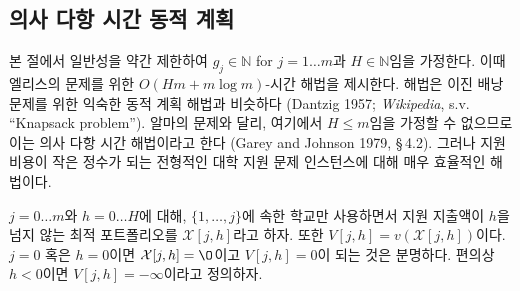 \documentclass[11pt]{article} %
\newif\ifen
\theoremstyle{definition}
\theoremstyle{definition}
\begin{document}
\ifen \subsection{Pseudopolynomial-time dynamic program} \else\subsection{의사 다항 시간 동적 계획} \fi
\ifen
In this subsection, we assume, with a small loss of generality, that $g_j \in \mathbb{N}$ for $j = 1\dots m$ and $H \in\mathbb{N}$, and provide an algorithmic solution to Ellis's problem that runs in $O(Hm + m\log m)$-time. The algorithm resembles a familiar dynamic programming algorithm for the binary knapsack problem (Dantzig 1957; \emph{Wikipedia}, s.v. ``Knapsack problem''). Because we cannot assume that $H \leq m$ (as was the case in Alma's problem), this represents a pseudopolynomial-time solution (Garey and Johnson 1979, \S\,4.2). However, it is quite effective for typical college-application instances in which the application costs are small integers.
\else
본 절에서 일반성을 약간 제한하여 $g_j \in \mathbb{N}$ for $j = 1\dots m$과 $H \in\mathbb{N}$임을 가정한다. 이때 엘리스의 문제를 위한 $O(Hm + m\log m)$-시간 해법을 제시한다. 해법은 이진 배낭 문제를 위한 익숙한 동적 계획 해법과 비슷하다 (Dantzig 1957; \emph{Wikipedia}, s.v. ``Knapsack problem''). 알마의 문제와 달리, 여기에서 $H \leq m$임을 가정할 수 없으므로 이는 의사 다항 시간 해법이라고 한다 (Garey and Johnson 1979, \S\,4.2). 그러나 지원 비용이 작은 정수가 되는 전형적인 대학 지원 문제 인스턴스에 대해 매우 효율적인 해법이다.
\fi

\ifen 
For $j = 0 \dots m$ and $h = 0 \dots H$, let $\mathcal{X}[j, h]$ denote the optimal portfolio using only the schools $\{ 1, \dots, j\}$ and costing no more than $h$, and let $V[j,h] = v(\mathcal{X}[j, h])$.  It is clear that if $j=0$ or $h=0$, then $\mathcal{X}[j, h] = \O$ and $V[j, h] = 0$.  For convenience, we also define $V[j, h] = -\infty$ for all $h < 0$.
\else
$j = 0 \dots m$와 $h = 0 \dots H$에 대해, $\{ 1, \dots, j\}$에 속한 학교만 사용하면서 지원 지출액이 $h$을 넘지 않는 최적 포트폴리오를 $\mathcal{X}[j, h]$라고 하자. 또한  $V[j,h] = v(\mathcal{X}[j, h])$이다. $j=0$ 혹은 $h=0$이면 $\mathcal{X}[j, h] = \O$이고 $V[j, h] = 0$이 되는 것은 분명하다. 편의상 $h < 0$이면 $V[j, h] = -\infty$이라고 정의하자.
\fi
\end{document}
